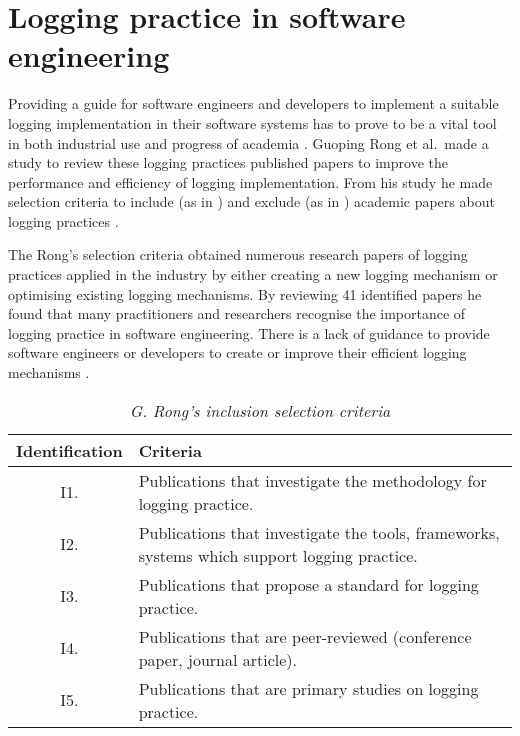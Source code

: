 \cleardoublepage
\appendix

\chapter{Logging practice in software engineering}
Providing a guide for software engineers and developers to implement a suitable logging implementation in their software systems has to prove to be a vital tool in both industrial use and progress of academia \cite{Rong2018a}. Guoping Rong et al.~made a study to review these logging practices published papers to improve the performance and efficiency of logging implementation. From his study he made selection criteria to include (as in ) and exclude (as in ) academic papers about logging practices \cite{Rong2018a,Rong2018}.\par The Rong's selection criteria obtained numerous research papers of logging practices applied in the industry by either creating a new logging mechanism or optimising existing logging mechanisms. By reviewing 41 identified papers he found that many practitioners and researchers recognise the importance of logging practice in software engineering. There is a lack of guidance to provide software engineers or developers to create or improve their efficient logging mechanisms \cite{Rong2018a,Zhu2015}. 

\begin{table}[!htb]
	\centering
	\caption[G. Rong's inclusion selection criteria]
	{\textit{G. Rong's inclusion selection criteria \cite{Rong2018a}}}
	\label{tbl:CH1_RongIncSelectionCriteria}
	\begin{tabularx}{\textwidth}{|c|X|}
		\hline \textbf{Identification} & \textbf{Criteria} \\
		\hline I1. & Publications that investigate the methodology for logging practice. \\
		\hline I2. & Publications that investigate the tools, frameworks, systems which support logging practice. \\
		\hline I3. & Publications that propose a standard for logging practice.\\
		\hline I4. & Publications that are peer-reviewed (conference paper, journal article). \\
		\hline I5. & Publications that are primary studies on logging practice. \\
		\hline
	\end{tabularx}
\end{table}

